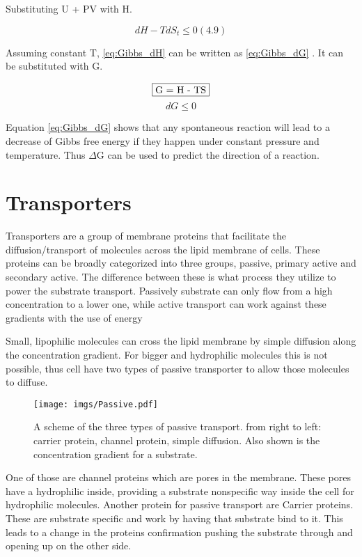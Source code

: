 Substituting U + PV with H.

\begin{equation}
    dH - TdS_t \leq 0 (4.9)
    \label{eq:Gibbs_dH}
\end{equation}

Assuming constant T, \ref{eq:Gibbs_dH} can be written as \ref{eq:Gibbs_dG} . It can be substituted with G.

\begin{equation}
    \fbox{G = H - TS}
    \label{eq:Gibbs_G}
\end{equation}
\begin{equation}
    dG \leq 0 
    \label{eq:Gibbs_dG}
\end{equation}

Equation \ref{eq:Gibbs_dG} shows that any spontaneous reaction will lead to a decrease of Gibbs free energy if they happen under constant pressure and temperature. Thus $\Delta$G can be used to predict the direction of a reaction.

\section{Transporters}
Transporters are a group of membrane proteins that facilitate the diffusion/transport of molecules across the lipid membrane of cells. These proteins can be broadly categorized into three groups, passive, primary active and secondary active. The difference between these is what process they utilize to power the substrate transport. Passively substrate can only flow from a high concentration to a lower one, while active transport can work against these gradients with the use of energy

Small, lipophilic molecules can cross the lipid membrane by simple diffusion along the concentration gradient. For bigger and hydrophilic molecules this is not possible, thus cell have two types of passive transporter to allow those molecules to diffuse. 

\begin{figure}[H]
    \centering
    \texttt{[image: imgs/Passive.pdf]}
    \caption{A scheme of the three types of passive transport. from right to left: carrier protein, channel protein, simple diffusion. Also shown is the concentration gradient for a substrate.}
    \label{fig:Passive}
\end{figure}

One of those are channel proteins which are pores in the membrane. These pores have a hydrophilic inside, providing a substrate nonspecific way inside the cell for hydrophilic molecules. Another protein for passive transport are Carrier proteins. These are substrate specific and work by having that substrate bind to it. This leads to a change in the proteins confirmation pushing the substrate through and opening up on the other side.

